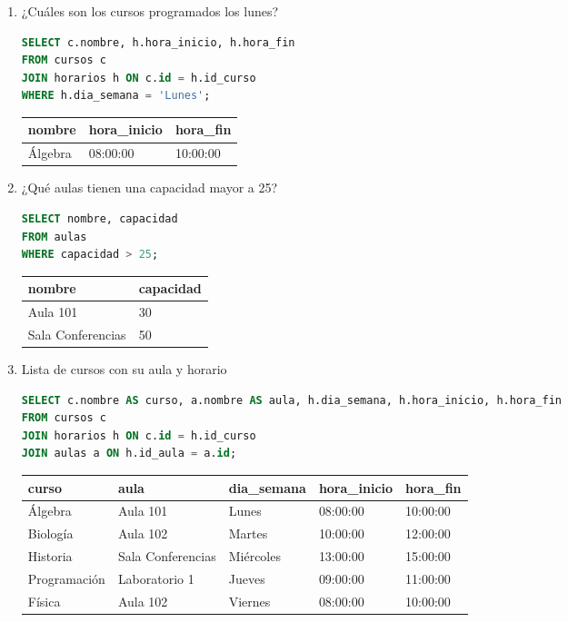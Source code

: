 \documentclass[12pt,letterpaper]{article}
\begin{document}
\begin{enumerate}
    \item ¿Cuáles son los cursos programados los lunes?
\begin{lstlisting}[language=SQL, frame=single]
SELECT c.nombre, h.hora_inicio, h.hora_fin 
FROM cursos c 
JOIN horarios h ON c.id = h.id_curso 
WHERE h.dia_semana = 'Lunes';
\end{lstlisting}
    \begin{table}[H]
        \centering
        \begin{tabular}{|l|l|l|}
        \hline
        \textbf{nombre} & \textbf{hora\_inicio} & \textbf{hora\_fin} \\ \hline
        Álgebra & 08:00:00 & 10:00:00 \\ \hline
        \end{tabular}
    \end{table}

    \item ¿Qué aulas tienen una capacidad mayor a 25?
\begin{lstlisting}[language=SQL, frame=single]
SELECT nombre, capacidad 
FROM aulas 
WHERE capacidad > 25;
\end{lstlisting}
    \begin{table}[H]
        \centering
        \begin{tabular}{|l|l|}
        \hline
        \textbf{nombre} & \textbf{capacidad} \\ \hline
        Aula 101 & 30 \\ 
        Sala Conferencias & 50 \\ \hline
        \end{tabular}
    \end{table}

    \item Lista de cursos con su aula y horario
\begin{lstlisting}[language=SQL, frame=single]
SELECT c.nombre AS curso, a.nombre AS aula, h.dia_semana, h.hora_inicio, h.hora_fin 
FROM cursos c 
JOIN horarios h ON c.id = h.id_curso 
JOIN aulas a ON h.id_aula = a.id;
\end{lstlisting}
    \begin{table}[H]
        \centering
        \begin{tabular}{|l|l|l|l|l|}
        \hline
        \textbf{curso} & \textbf{aula} & \textbf{dia\_semana} & \textbf{hora\_inicio} & \textbf{hora\_fin} \\ \hline
        Álgebra & Aula 101 & Lunes & 08:00:00 & 10:00:00 \\ 
        Biología & Aula 102 & Martes & 10:00:00 & 12:00:00 \\ 
        Historia & Sala Conferencias & Miércoles & 13:00:00 & 15:00:00 \\ 
        Programación & Laboratorio 1 & Jueves & 09:00:00 & 11:00:00 \\ 
        Física & Aula 102 & Viernes & 08:00:00 & 10:00:00 \\ \hline
        \end{tabular}
    \end{table}


\end{enumerate}
\end{document}

